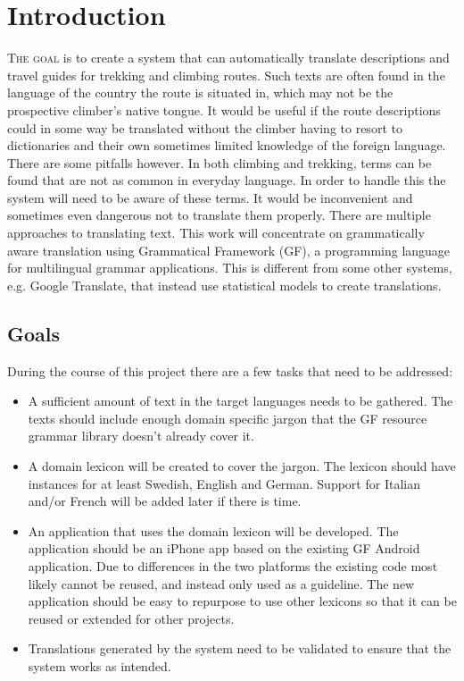 \chapter{Introduction}
\lettrine[lines=4, loversize=-0.1, lraise=0.1]{T}{he goal} is to create a system that can automatically translate descriptions and travel guides for trekking and climbing routes. Such texts are often found in the language of the country the route is situated in, which may not be the prospective climber's native tongue. It would be useful if the route descriptions could in some way be translated without the climber having to resort to dictionaries and their own sometimes limited knowledge of the foreign language.
There are some pitfalls however. In both climbing and trekking, terms can be found that are not as common in everyday language. In order to handle this the system will need to be aware of these terms. It would be inconvenient and sometimes even dangerous not to translate them properly.
There are multiple approaches to translating text. This work will concentrate on grammatically aware translation using Grammatical Framework (GF), a programming language for multilingual grammar applications. This is different from some other systems, e.g. Google Translate, that instead use statistical models to create translations.
\section{Goals}
During the course of this project there are a few tasks that need to be addressed:
\begin{itemize}
\item A sufficient amount of text in the target languages needs to be gathered. The texts should include enough domain specific jargon that the GF resource grammar library doesn't already cover it.
\item A domain lexicon will be created to cover the jargon. The lexicon should have instances for at least Swedish, English and German. Support for Italian and/or French will be added later if there is time.
\item An application that uses the domain lexicon will be developed. The application should be an iPhone app based on the existing GF Android application. Due to differences in the two platforms the existing code most likely cannot be reused, and instead only used as a guideline. The new application should be easy to repurpose to use other lexicons so that it can be reused or extended for other projects.
\item Translations generated by the system need to be validated to ensure that the system works as intended.
\end{itemize}
